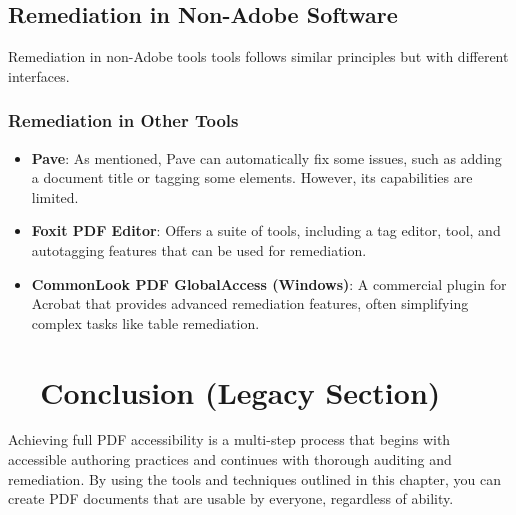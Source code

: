 \subsection{Remediation in Non-Adobe Software}
\label{subsec:remediation-non-adobe}
Remediation in non-Adobe tools tools follows similar principles but with different interfaces.

\subsubsection{Remediation in Other Tools}
\label{ssubsec:remediation-other-tools}
\begin{itemize}
	\item \textbf{Pave}: As mentioned, Pave can automatically fix some issues, such as adding a document title or tagging some elements. However, its capabilities are limited.
	\item \textbf{Foxit PDF Editor}: Offers a suite of  tools, including a tag editor,  tool, and autotagging features that can be used for remediation.
	\item \textbf{CommonLook PDF GlobalAccess (Windows)\supercite{AllyantCommonLook}}: A commercial plugin for Acrobat that provides advanced remediation features, often simplifying complex tasks like table remediation.
\end{itemize}

\section{~~Conclusion (Legacy Section)}
\label{sec:pdf-report-conclusion}
Achieving full PDF accessibility is a multi-step process that begins with accessible authoring practices and continues with thorough auditing and remediation. By using the tools and techniques outlined in this chapter, you can create PDF documents that are usable by everyone, regardless of ability.


